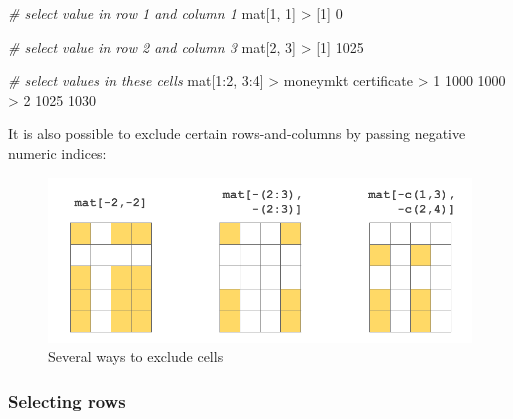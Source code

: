 \documentclass[
]{book}
\newenvironment{Shaded}{\begin{snugshade}}{\end{snugshade}}
\newcommand{\CommentTok}[1]{\textcolor[rgb]{0.56,0.35,0.01}{\textit{#1}}}
\newcommand{\DecValTok}[1]{\textcolor[rgb]{0.00,0.00,0.81}{#1}}
\newcommand{\NormalTok}[1]{#1}
\newcommand{\SpecialCharTok}[1]{\textcolor[rgb]{0.00,0.00,0.00}{#1}}
\begin{document}
\begin{Shaded}
\begin{Highlighting}[]
\CommentTok{\# select value in row 1 and column 1}
\NormalTok{mat[}\DecValTok{1}\NormalTok{, }\DecValTok{1}\NormalTok{]}
\SpecialCharTok{\textgreater{}}\NormalTok{ [}\DecValTok{1}\NormalTok{] }\DecValTok{0}

\CommentTok{\# select value in row 2 and column 3}
\NormalTok{mat[}\DecValTok{2}\NormalTok{, }\DecValTok{3}\NormalTok{]}
\SpecialCharTok{\textgreater{}}\NormalTok{ [}\DecValTok{1}\NormalTok{] }\DecValTok{1025}

\CommentTok{\# select values in these cells}
\NormalTok{mat[}\DecValTok{1}\SpecialCharTok{:}\DecValTok{2}\NormalTok{, }\DecValTok{3}\SpecialCharTok{:}\DecValTok{4}\NormalTok{]}
\SpecialCharTok{\textgreater{}}\NormalTok{   moneymkt certificate}
\SpecialCharTok{\textgreater{}} \DecValTok{1}     \DecValTok{1000}        \DecValTok{1000}
\SpecialCharTok{\textgreater{}} \DecValTok{2}     \DecValTok{1025}        \DecValTok{1030}
\end{Highlighting}
\end{Shaded}

It is also possible to exclude certain rows-and-columns by passing negative
numeric indices:

\begin{figure}

{\centering \includegraphics[width=0.8\linewidth]{images/objects/obj-matrix-cells2} 

}

\caption{Several ways to exclude cells}\label{fig:unnamed-chunk-124}
\end{figure}

\hypertarget{selecting-rows}{%
\subsubsection*{Selecting rows}\label{selecting-rows}}
\end{document}
